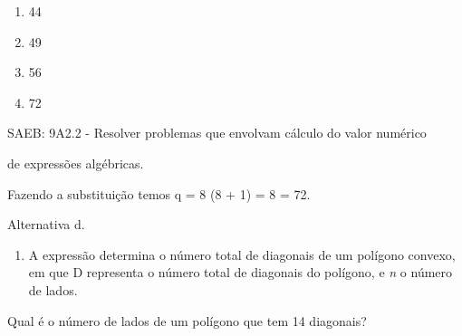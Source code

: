 \begin{escolha}
\begin{boxmedio}
\begin{boxmedio}
{\begin{boxpeq}
\begin{boxpeq}
{\begin{boxpeq}
\begin{boxmedio}
\begin{boxmedio}
\begin{boxpeq}
\begin{boxmedio}
\begin{boxpeq}
\begin{boxpeq}
\begin{boxpeq}
\begin{boxpeq}
\begin{boxmedio}
{\begin{boxmedio}
\begin{boxmedio}
\begin{boxpeq}
\begin{boxmedio}
\begin{boxpeq}
\begin{boxpeq}
\begin{boxpeq}
\begin{escolha}
{\begin{boxmedio}
\begin{boxpeq}
\begin{boxpeq}
\begin{boxpeq}
\begin{boxpeq}
\begin{boxpeq}
\begin{boxmedio}
\begin{boxpeq}
\begin{boxpeq}
\begin{boxpeq}
{\begin{boxpeq}
\begin{boxmedio}
\begin{boxpeq}
\begin{boxpeq}
\begin{boxpeq}
{\begin{boxpeq}
\begin{boxmedio}
{\begin{boxpeq}
\begin{boxpeq}
\begin{boxmedio}
\begin{boxmedio}
\begin{boxpeq}
\begin{boxpeq}
{\begin{boxpeq}
\begin{boxpeq}
\begin{boxpeq}
\begin{boxpeq}
\begin{boxpeq}
\begin{escolha}
\begin{escolha}
{\begin{boxmedio}
\begin{boxpeq}
\begin{q°}
\begin{boxmedio}
\begin{boxpeq}
\begin{boxpeq}
\begin{boxmedio}
\begin{boxmedio}
\begin{boxmedio}
\begin{boxmedio}
{\begin{escolha}
\begin{escolha}
\begin{escolha}
\begin{escolha}
\begin{escolha}
\begin{escolha}
{\begin{enumerate}

\item
  44
\item
  49
\item
  56
\item
  72
\end{enumerate}

SAEB: 9A2.2 - Resolver problemas que envolvam cálculo do valor numérico

de expressões algébricas.

Fazendo a substituição temos q = 8 \cdot (8 + 1) = 8  = 72.

Alternativa d.

\begin{enumerate}
\num{\arabic{enumi}.}
\setcounter{enumi}{6}
\tightlist
\item
  A expressão determina o número total de diagonais de um polígono
  convexo, em que D representa o número total de diagonais do polígono,
  e \emph{n} o número de lados.
\end{enumerate}

Qual é o número de lados de um polígono que tem 14 diagonais?

}
\end{escolha}
\end{escolha}
\end{escolha}
\end{escolha}
\end{escolha}
\end{escolha}}
\end{boxmedio}
\end{boxmedio}
\end{boxmedio}
\end{boxmedio}
\end{boxpeq}
\end{boxpeq}
\end{boxmedio}
\end{q°}
\end{boxpeq}
\end{boxmedio}}
\end{escolha}
\end{escolha}
\end{boxpeq}
\end{boxpeq}
\end{boxpeq}
\end{boxpeq}
\end{boxpeq}}
\end{boxpeq}
\end{boxpeq}
\end{boxmedio}
\end{boxmedio}
\end{boxpeq}
\end{boxpeq}}
\end{boxmedio}
\end{boxpeq}}
\end{boxpeq}
\end{boxpeq}
\end{boxpeq}
\end{boxmedio}
\end{boxpeq}}
\end{boxpeq}
\end{boxpeq}
\end{boxpeq}
\end{boxmedio}
\end{boxpeq}
\end{boxpeq}
\end{boxpeq}
\end{boxpeq}
\end{boxpeq}
\end{boxmedio}}
\end{escolha}
\end{boxpeq}
\end{boxpeq}
\end{boxpeq}
\end{boxmedio}
\end{boxpeq}
\end{boxmedio}
\end{boxmedio}}
\end{boxmedio}
\end{boxpeq}
\end{boxpeq}
\end{boxpeq}
\end{boxpeq}
\end{boxmedio}
\end{boxpeq}
\end{boxmedio}
\end{boxmedio}
\end{boxpeq}}
\end{boxpeq}
\end{boxpeq}}
\end{boxmedio}
\end{boxmedio}
\end{escolha}
